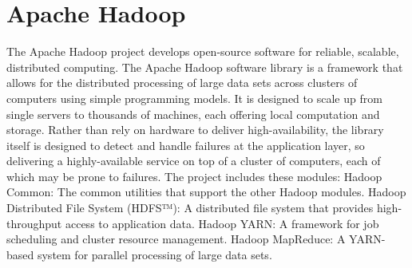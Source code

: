 \section{Apache Hadoop}

The Apache Hadoop\cite{hip-sp18-515-www-hadoop} project develops 
open-source software for reliable, scalable, distributed computing. 
The Apache Hadoop software library is a framework that allows for the 
distributed processing of large data sets across clusters of computers 
using simple programming models. It is designed to scale up from single 
servers to thousands of machines, each offering local computation and 
storage. Rather than rely on hardware to deliver high-availability, the 
library itself is designed to detect and handle failures at the 
application layer, so delivering a highly-available service on top of 
a cluster of computers, each of which may be prone to failures. 
The project includes these modules: 
Hadoop Common: The common utilities that support the other Hadoop 
modules. 
Hadoop Distributed File System (HDFS™): A distributed file system 
that provides high-throughput access to application data.
Hadoop YARN: A framework for job scheduling and cluster resource 
management.
Hadoop MapReduce: A YARN-based system for parallel processing of 
large data sets.
